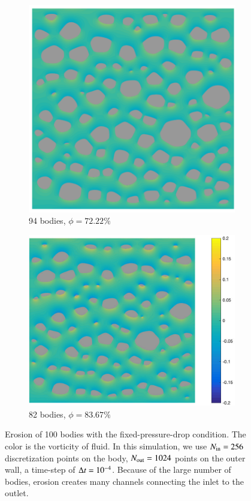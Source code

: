 \documentclass[preprint,10pt]{elsarticle}
\begin{document}
\begin{figure}[H]
\begin{subfigure}[b]{0.5\textwidth}
\includegraphics*[width =0.9\linewidth]{./figs/100b_150}
\caption{94 bodies, $\phi = 72.22\%$}
\end{subfigure}%
\begin{subfigure}[b]{0.5\textwidth}
\includegraphics*[width =1.1\linewidth]{./figs/100b_200}
\caption{82 bodies, $\phi = 83.67\%$}
\end{subfigure}
\caption{\label{fig:Eroding100vort} Erosion of 100 bodies with the
  fixed-pressure-drop condition. The color is the vorticity of fluid. In
  this simulation, we use $N_{\mathrm{in}} = 256$ discretization points on the
  body, $N_{\mathrm{out}} = 1024$ points on the outer wall, a time-step of
  $\Delta t=10^{-4}$.  Because of the large number of bodies, erosion creates
  many channels connecting the inlet to the outlet.}
\end{figure}
\end{document}
